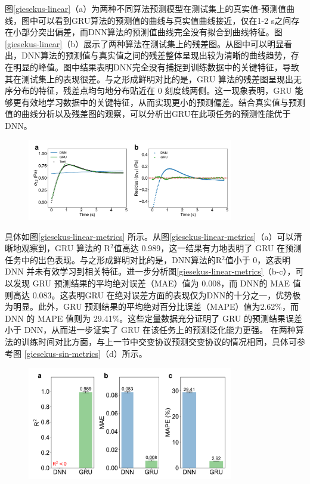 图\ref{giesekus-linear}（a）为两种不同算法预测模型在测试集上的真实值-预测值曲线，图中可以看到GRU算法的预测值的曲线与真实值曲线接近，仅在1-2 s之间存在小部分突出偏差，而DNN算法的预测值曲线完全没有拟合到曲线特征。图\ref{giesekus-linear}（b）展示了两种算法在测试集上的残差图。从图中可以明显看出，DNN算法的预测值与真实值之间的残差整体呈现出较为清晰的曲线趋势，存在明显的峰值。图中结果表明DNN完全没有捕捉到训练数据中的关键特征，导致其在测试集上的表现很差。与之形成鲜明对比的是，GRU 算法的残差图呈现出无序分布的特征，残差点均匀地分布贴近在 0 刻度线两侧。这一现象表明，GRU 能够更有效地学习数据中的关键特征，从而实现更小的预测偏差。结合真实值与预测值的曲线分析以及残差图的观察，可以分析出GRU在此项任务的预测性能优于DNN。
\begin{figure}[htbp]
  \centering
  \includegraphics[width=0.8\textwidth]{Fig/giesekus-linear.pdf}
  \FigureBicaption{\label{giesekus-linear}}{}
\end{figure}

具体如图\ref{giesekus-linear-metrics} 所示。从图\ref{giesekus-linear-metrics}（a）可以清晰地观察到，GRU 算法的 R$^2$值高达 0.989，这一结果有力地表明了 GRU 在预测任务中的出色表现。与之形成鲜明对比的是，DNN算法的R$^2$值小于 0，这表明 DNN 并未有效学习到相关特征。进一步分析图\ref{giesekus-linear-metrics}（b-c），可以发现 GRU 预测结果的平均绝对误差（MAE）值为 0.008，而 DNN的 MAE 值则高达 0.083。这表明GRU 在绝对误差方面的表现仅为DNN的十分之一，优势极为明显。此外，GRU 预测结果的平均绝对百分比误差（MAPE）值为2.62\%，而DNN 的 MAPE 值则为 29.41\%。这些定量数据充分证明了 GRU 的预测结果误差小于 DNN，从而进一步证实了 GRU 在该任务上的预测泛化能力更强。
在两种算法的训练时间对比方面，与上一节中交变协议预测交变协议的情况相同，具体可参考图 \ref{giesekus-sin-metrics}（d）所示。
\begin{figure}[htbp]
  \centering
  \includegraphics[width=0.8\textwidth]{Fig/giesekus-linear-metrics.pdf}
  \FigureBicaption{\label{giesekus-linear-metrics}}{}
\end{figure}
